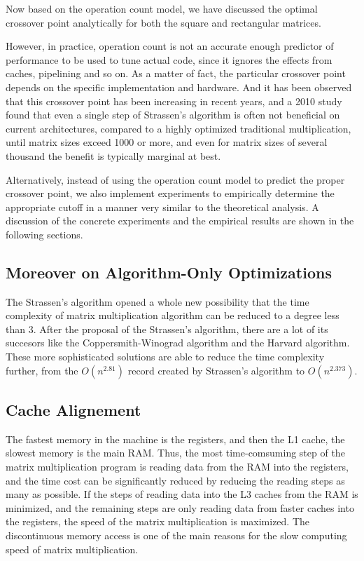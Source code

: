 \documentclass[UTF8]{ctexart}
\begin{document}
Now based on the operation count model, we have discussed the optimal crossover point analytically for both the square and rectangular matrices.

However, in practice, operation count is not an accurate enough predictor of performance to be used to tune actual code, since it ignores the effects from caches, pipelining and so on. As a matter of fact, the particular crossover point depends on the specific implementation and hardware. And it has been observed that this crossover point has been increasing in recent years, and a 2010 study found that even a single step of Strassen's algorithm is often not beneficial on current architectures, compared to a highly optimized traditional multiplication, until matrix sizes exceed 1000 or more, and even for matrix sizes of several thousand the benefit is typically marginal at best.

Alternatively, instead of using the operation count model to predict the proper crossover point, we also implement experiments to empirically determine the appropriate cutoff in a manner very similar to the theoretical analysis. A discussion of the concrete experiments and the empirical results are shown in the following sections.
\subsection{Moreover on Algorithm-Only Optimizations}
\label{subsec::MoAOO}
The Strassen's algorithm opened a whole new possibility that the time complexity of matrix multiplication algorithm can be reduced to a degree less than 3. After the proposal of the Strassen's algorithm, there are a lot of its succesors like the Coppersmith-Winograd algorithm and the Harvard algorithm. These more sophisticated solutions are able to reduce the time complexity further, from the \(O(n^{2.81})\) record created by Strassen's algorithm to \(O(n^{2.373})\).
\subsection{Cache Alignement}
The fastest memory in the machine is the registers, and then the L1 cache, the slowest memory is the main RAM. Thus, the most time-comsuming step of the matrix multiplication program is reading data from the RAM into the registers, and the time cost can be significantly reduced by reducing the reading steps as many as possible. If the steps of reading data into the L3 caches from the RAM is minimized, and the remaining steps are only reading data from faster caches into the registers, the speed of the matrix multiplication is maximized. The discontinuous memory access is one of the main reasons for the slow computing speed of matrix multiplication.
\end{document}
